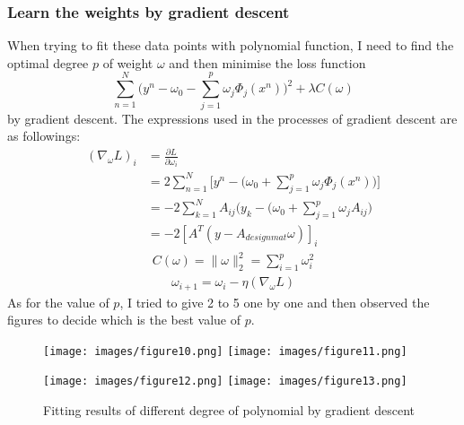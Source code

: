 \documentclass[a4paper, 12pt]{article}
\begin{document}
    \subsubsection{Learn the weights by gradient descent}
    When trying to fit these data points with polynomial function, I need to find the optimal degree $p$ of weight $\omega$ and then minimise the loss function 
    \begin{equation*}
      \sum_{n=1}^N \Big(y^n-\omega_0- \sum_{j=1}^p \omega_j \Phi_j(x^n)  \Big)^2 + \lambda C(\omega)
    \end{equation*}
    by gradient descent. The expressions used in the processes of gradient descent are as followings:
    \begin{equation*}
      \begin{aligned}
        (\nabla_{\omega}L)_i &= \frac{\partial L}{\partial \omega_i}\ \\
        &= 2 \sum_{n=1}^N \Big[ y^n-\big(\omega_0 + \sum_{j=1}^p \omega_j \Phi_j (x^n) \big) \Big]  \\
        &= -2 \sum_{k=1}^N A_{ij} \big(y_k - (\omega_0 + \sum_{j=1}^p \omega_j A_{ij} \big)  \\
        &= -2 [A^T (y-A_{designmat} \omega)]_i
      \end{aligned}
    \end{equation*}
    \begin{equation*}
      \begin{aligned}
        C(\omega) = \| \omega \|_2^2 = \sum_{i=1}^p \omega_i^2
      \end{aligned}
    \end{equation*}
    \begin{equation*}
      \begin{aligned}
        \omega_{i+1} = \omega_i - \eta (\nabla_{\omega}L)
      \end{aligned}
    \end{equation*}
    As for the value of $p$, I tried to give 2 to 5 one by one and then observed the figures to decide which is the best value of $p$.
    \begin{figure}[h]
      \centering
      \begin{minipage}[b]{0.45\textwidth}
        \texttt{[image: images/figure10.png]}
        \texttt{[image: images/figure11.png]}
      \end{minipage}%
      \hspace{0.04\textwidth}%
      \begin{minipage}[b]{0.45\textwidth}
        \texttt{[image: images/figure12.png]}
        \texttt{[image: images/figure13.png]}
      \end{minipage}
      \caption{Fitting results of different degree of polynomial by gradient descent}
    \end{figure}
\end{document}
